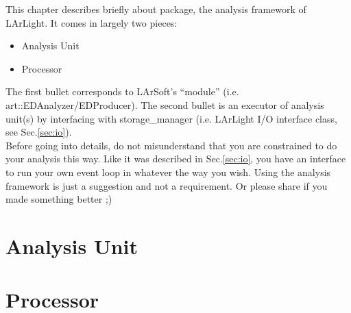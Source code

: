 
This chapter describes briefly about \Analysis package, the analysis framework of LArLight.
It comes in largely two pieces:
\begin{itemize}
\item Analysis Unit
\item Processor
\end{itemize}
The first bullet corresponds to LArSoft's ``module'' (i.e. {\ttfamily art::EDAnalyzer/EDProducer}).
The second bullet is an executor of analysis unit(s) by interfacing with {\ttfamily storage\_manager} (i.e. LArLight I/O interface class, see Sec.\ref{sec:io}). \\

Before going into details, do not misunderstand that you are constrained to do your analysis this way.
Like it was described in Sec.\ref{sec:io}, you have an interface to run your own event loop in whatever the way you wish.
Using the analysis framework is just a suggestion and not a requirement.
Or please share if you made something better ;)

\section{Analysis Unit}
\label{sec:ana_base}


\section{Processor}
\label{sec:ana_processor}

